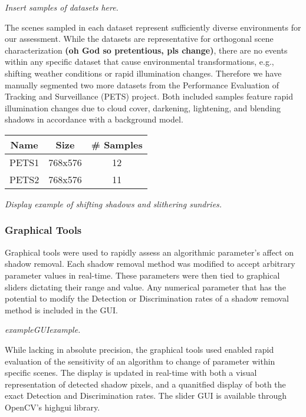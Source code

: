 \documentclass[12pt]{report}
\begin{document}
\textit{Insert samples of datasets here.}

The scenes sampled in each dataset represent sufficiently diverse environments for our assessment. While the datasets are representative for orthogonal scene characterization \textbf{(oh God so pretentious, pls change)}, there are no events within any specific dataset that cause environmental transformations, e.g., shifting weather conditions or rapid illumination changes. Therefore we have manually segmented two more datasets from the Performance Evaluation of Tracking and Surveillance (PETS) project. Both included samples feature rapid illumination changes due to cloud cover, darkening, lightening, and blending shadows in accordance with a background model.

\begin{center}
\begin{tabular}{ |c|c|c| }
	\hline
	\textbf{Name} & \textbf{Size} & \textbf{\# Samples} \\
	\hline
	\hline
	PETS1 & 768x576 & 12 \\
	\hline
	PETS2 & 768x576 & 11 \\
	\hline
\end{tabular}
\end{center}

\textit{Display example of shifting shadows and slithering sundries.}

\subsubsection{Graphical Tools}
Graphical tools were used to rapidly assess an algorithmic parameter's affect on shadow removal. Each shadow removal method was modified to accept arbitrary parameter values in real-time. These parameters were then tied to graphical sliders dictating their range and value. Any numerical parameter that has the potential to modify the Detection or Discrimination rates of a shadow removal method is included in the GUI.

\textit{exampleGUIexample.}

While lacking in absolute precision, the graphical tools used enabled rapid evaluation of the sensitivity of an algorithm to change of parameter within specific scenes. The display is updated in real-time with both a visual representation of detected shadow pixels, and a quanitfied display of both the exact Detection and Discrimination rates. The slider GUI is available through OpenCV's highgui library.
\end{document}

